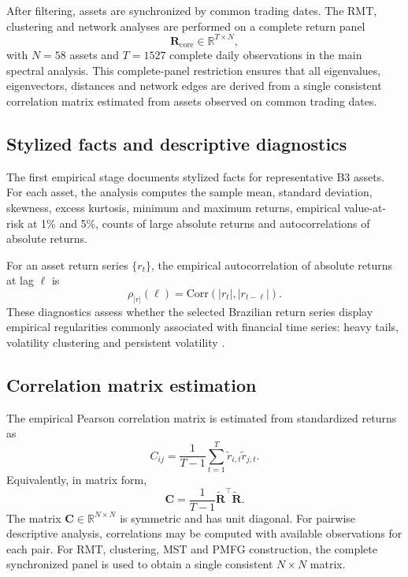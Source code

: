 After filtering, assets are synchronized by common trading dates. The RMT, clustering and network analyses are performed on a complete return panel
\begin{equation}
\mathbf{R}_{\mathrm{core}}
\in
\mathbb{R}^{T \times N},
\end{equation}
with $N=58$ assets and $T=1527$ complete daily observations in the main spectral analysis. This complete-panel restriction ensures that all eigenvalues, eigenvectors, distances and network edges are derived from a single consistent correlation matrix estimated from assets observed on common trading dates.

\subsection{Stylized facts and descriptive diagnostics}
\label{subsec:stylized_method}

The first empirical stage documents stylized facts for representative B3 assets. For each asset, the analysis computes the sample mean, standard deviation, skewness, excess kurtosis, minimum and maximum returns, empirical value-at-risk at 1\% and 5\%, counts of large absolute returns and autocorrelations of absolute returns.

For an asset return series $\{r_t\}$, the empirical autocorrelation of absolute returns at lag $\ell$ is
\begin{equation}
\rho_{|r|}(\ell)
=
\mathrm{Corr}(|r_t|, |r_{t-\ell}|).
\end{equation}
These diagnostics assess whether the selected Brazilian return series display empirical regularities commonly associated with financial time series: heavy tails, volatility clustering and persistent volatility \cite{cont_2001_empirical}.

\subsection{Correlation matrix estimation}
\label{subsec:correlation_method}

The empirical Pearson correlation matrix is estimated from standardized returns as
\begin{equation}
C_{ij}
=
\frac{1}{T-1}
\sum_{t=1}^{T}
\tilde{r}_{i,t}\tilde{r}_{j,t}.
\end{equation}
Equivalently, in matrix form,
\begin{equation}
\mathbf{C}
=
\frac{1}{T-1}
\widetilde{\mathbf{R}}^{\top}
\widetilde{\mathbf{R}}.
\end{equation}
The matrix $\mathbf{C}\in\mathbb{R}^{N\times N}$ is symmetric and has unit diagonal. For pairwise descriptive analysis, correlations may be computed with available observations for each pair. For RMT, clustering, MST and PMFG construction, the complete synchronized panel is used to obtain a single consistent $N\times N$ matrix.


